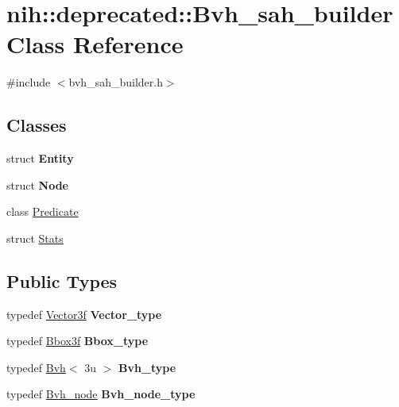 \hypertarget{classnih_1_1deprecated_1_1_bvh__sah__builder}{
\section{nih\-:\-:deprecated\-:\-:\-Bvh\-\_\-sah\-\_\-builder \-Class \-Reference}
\label{classnih_1_1deprecated_1_1_bvh__sah__builder}
}


{\ttfamily \#include $<$bvh\-\_\-sah\-\_\-builder.\-h$>$}

\subsection*{\-Classes}
\begin{DoxyCompactItemize}
\item 
struct {\bfseries \-Entity}
\item 
struct {\bfseries \-Node}
\item 
class \hyperlink{classnih_1_1deprecated_1_1_bvh__sah__builder_1_1_predicate}{\-Predicate}
\item 
struct \hyperlink{structnih_1_1deprecated_1_1_bvh__sah__builder_1_1_stats}{\-Stats}
\end{DoxyCompactItemize}
\subsection*{\-Public \-Types}
\begin{DoxyCompactItemize}
\item 
\hypertarget{classnih_1_1deprecated_1_1_bvh__sah__builder_a0c383726c76f31ce9c1600c91b93bcbf}{
typedef \hyperlink{structnih_1_1_vector}{\-Vector3f} {\bfseries \-Vector\-\_\-type}}
\label{classnih_1_1deprecated_1_1_bvh__sah__builder_a0c383726c76f31ce9c1600c91b93bcbf}

\item 
\hypertarget{classnih_1_1deprecated_1_1_bvh__sah__builder_ae58b7b9f6868c31c9f429bd4a4543538}{
typedef \hyperlink{structnih_1_1_bbox}{\-Bbox3f} {\bfseries \-Bbox\-\_\-type}}
\label{classnih_1_1deprecated_1_1_bvh__sah__builder_ae58b7b9f6868c31c9f429bd4a4543538}

\item 
\hypertarget{classnih_1_1deprecated_1_1_bvh__sah__builder_a7db26206e691d271f3b31dbf1b4919ff}{
typedef \hyperlink{structnih_1_1_bvh}{\-Bvh}$<$ 3u $>$ {\bfseries \-Bvh\-\_\-type}}
\label{classnih_1_1deprecated_1_1_bvh__sah__builder_a7db26206e691d271f3b31dbf1b4919ff}

\item 
\hypertarget{classnih_1_1deprecated_1_1_bvh__sah__builder_aedf7c43673809288478348ae3ac2b325}{
typedef \hyperlink{structnih_1_1_bvh__node}{\-Bvh\-\_\-node} {\bfseries \-Bvh\-\_\-node\-\_\-type}}
\label{classnih_1_1deprecated_1_1_bvh__sah__builder_aedf7c43673809288478348ae3ac2b325}

\end{DoxyCompactItemize}
